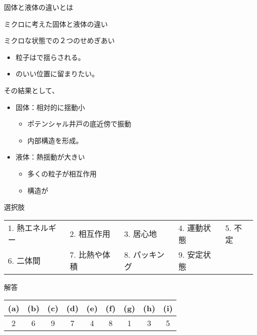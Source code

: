 \documentclass[uplatex,dvipdfmx,a4paper,11pt]{jsarticle}
\begin{document}
\begin{qlist}
\begin{qlist2}
			\qitem 固体と液体の違いとは
				\begin{itembox}[l]{ミクロに考えた固体と液体の違い}
					\begin{itembox}[l]{ミクロな状態での２つのせめぎあい}
						\begin{itemize}
							\item 粒子は\qbox{}で揺らされる。
							\item \qbox{}のいい位置に留まりたい。
						\end{itemize}
					\end{itembox}
					\begin{itembox}[l]{その結果として、}
						\begin{itemize}
							\item 固体：相対的に揺動小
							\begin{itemize}
								\item ポテンシャル井戸の底近傍で振動
								\item 内部構造を形成。
							\end{itemize}
							\item 液体：熱揺動が大きい
							\begin{itemize}
								\item 多くの粒子が相互作用
								\item 構造が\qbox{}
							\end{itemize}
						\end{itemize}
					\end{itembox}
				\end{itembox}

		\end{qlist2}

		\begin{itembox}[l]{選択肢}
			\begin{center}
				\begin{tabular}{lllll}
					1. 熱エネルギー	&2. 相互作用	&3. 居心地	&4. 運動状態	&5. 不定\\
					6. 二体間	&7. 比熱や体積		&8. パッキング	&9. 安定状態
				\end{tabular}
			\end{center}
		\end{itembox}
\end{qlist}

\begin{itembox}[l]{解答}
    \begin{center} 
      \begin{tabular}{|c|c|c|c|c|c|c|c|c|} \hline
        (a) & (b) & (c) & (d) & (e) & (f) & (g) & (h) & (i)\\ \hline
        2 & 6 & 9 & 7 & 4 & 8 & 1 & 3 & 5 \\ \hline		
      \end{tabular}
    \end{center}
\end{itembox}
\end{document}
